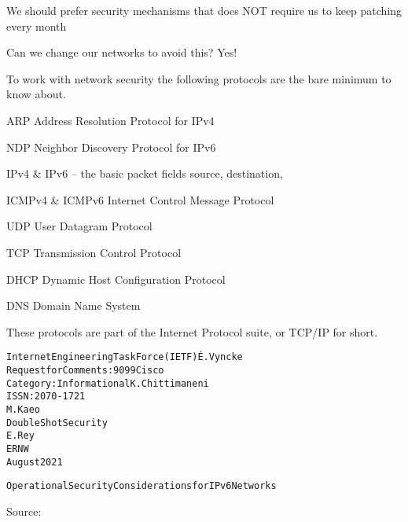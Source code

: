 \documentclass[Screen16to9,17pt]{foils}
\begin{document}



\begin{list2}
\item We should prefer security mechanisms that does NOT require us to keep patching every month
\item Can we change our networks to avoid this? Yes!
\end{list2}


To work with network security the following protocols are the bare minimum to know about.

\begin{list2}
\item ARP Address Resolution Protocol for IPv4
\item NDP Neighbor Discovery Protocol for IPv6
\item IPv4 \& IPv6 -- the basic packet fields source, destination,
\item ICMPv4 \& ICMPv6 Internet Control Message Protocol
\item UDP User Datagram Protocol
\item TCP Transmission Control Protocol
\item DHCP Dynamic Host Configuration Protocol
\item DNS Domain Name System
\end{list2}

These protocols are part of the Internet Protocol suite, or TCP/IP for short.




\begin{alltt}\small
Internet Engineering Task Force (IETF)                         É. Vyncke
Request for Comments: 9099                                         Cisco
Category: Informational                                  K. Chittimaneni
ISSN: 2070-1721
                                                                 M. Kaeo
                                                    Double Shot Security
                                                                  E. Rey
                                                                    ERNW
                                                             August 2021


         Operational Security Considerations for IPv6 Networks
\end{alltt}
Source: 
\end{document}
